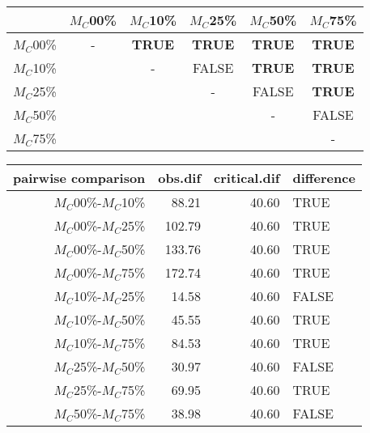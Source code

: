 \begin{tabular}{c|ccccc}
    \hline
              & $M_C$00\% & $M_C$10\% & $M_C$25\% & $M_C$50\% & $M_C$75\% \\
    \hline
    $M_C$00\% & - & \textbf{TRUE} & \textbf{TRUE} & \textbf{TRUE} & \textbf{TRUE}\\
    $M_C$10\% & & - & FALSE & \textbf{TRUE} & \textbf{TRUE} \\
    $M_C$25\% & & & - & FALSE & \textbf{TRUE} \\
    $M_C$50\% & & & & - & FALSE \\
    $M_C$75\% & & & & & - \\
    \hline
\end{tabular}
\centering
\begin{tabular}{rrrl}
 pairwise comparison & obs.dif & critical.dif & difference \\ 
  \hline
  $M_C$00\%-$M_C$10\% & 88.21 & 40.60 & TRUE \\ 
  $M_C$00\%-$M_C$25\% & 102.79 & 40.60 & TRUE \\ 
  $M_C$00\%-$M_C$50\% & 133.76 & 40.60 & TRUE \\ 
  $M_C$00\%-$M_C$75\% & 172.74 & 40.60 & TRUE \\ 
  $M_C$10\%-$M_C$25\% & 14.58 & 40.60 & FALSE \\ 
  $M_C$10\%-$M_C$50\% & 45.55 & 40.60 & TRUE \\
  $M_C$10\%-$M_C$75\% & 84.53 & 40.60 & TRUE \\ 
  $M_C$25\%-$M_C$50\% & 30.97 & 40.60 & FALSE \\ 
  $M_C$25\%-$M_C$75\% & 69.95 & 40.60 & TRUE \\ 
  $M_C$50\%-$M_C$75\% & 38.98 & 40.60 & FALSE \\ 
   \hline
\end{tabular}